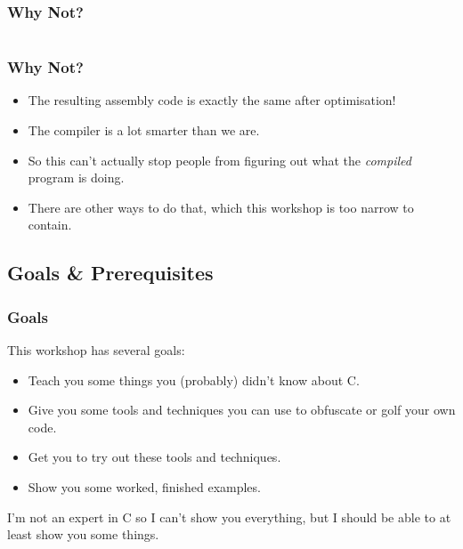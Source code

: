 \documentclass[xcolor]{beamer}
\begin{document}
\begin{frame}
	\frametitle{Why Not?}
	\pause
	
	\begin{columns}
		\begin{column}{0.45\textwidth}
			\centering
			
		\end{column}
		\begin{column}{0.45\textwidth}
			\centering
			
		\end{column}
	\end{columns}
\end{frame}

\begin{frame}
	\frametitle{Why Not?}
	\pause
	
	\begin{itemize}
		\item The resulting assembly code is exactly the same after optimisation!
		\pause
		\item The compiler is a lot smarter than we are.
		\pause
		\item So this can't actually stop people from figuring out what the \textit{compiled} program is doing.
		\pause
		\item There are other ways to do that, which this workshop is too narrow to contain.
	\end{itemize}
\end{frame}

\subsection{Goals \& Prerequisites}

\begin{frame}
	\frametitle{Goals}
	\pause
	
	This workshop has several goals:
	\pause
	
	\begin{itemize}
		\item Teach you some things you (probably) didn't know about C.
		\pause
		\item Give you some tools and techniques you can use to obfuscate or golf your own code.
		\pause
		\item Get you to try out these tools and techniques.
		\pause
		\item Show you some worked, finished examples.
	\end{itemize}
	\pause
	
	I'm not an expert in C so I can't show you everything, but I should be able to at least show you some things.
\end{frame}
\end{document}
